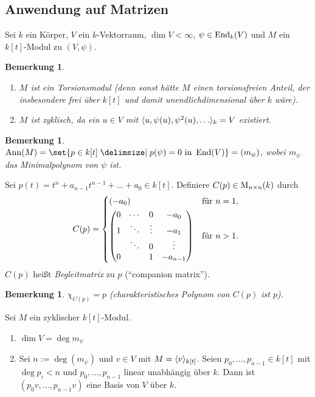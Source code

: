 \documentclass[12pt,a4paper]{scrartcl}
\theoremstyle{cplain}
\theoremstyle{cdef}
\newtheorem{beme}[thmcounter]{Bemerkung}
\begin{document}
\subsection{Anwendung auf Matrizen}
Sei $k$ ein Körper, $V$ ein $k$-Vektorraum, $\dim V<\infty$, $\psi\in \operatorname{End}_k(V)$ und $M$ ein $k[t]$-Modul zu $(V,\psi)$.
\begin{beme} \label{bem:4.18}
	\leavevmode
	\begin{enumerate}
		\item $M$ ist ein Torsionsmodul (denn sonst hätte $M$ einen torsionsfreien Anteil, der insbesondere frei über $k[t]$ und damit unendlichdimensional über $k$ wäre).
		\item $M$ ist zyklisch, da ein $u\in V$ mit $\<u, \psi(u), \psi^2(u),\dots\>_k = V$ existiert.
	\end{enumerate}
\end{beme}
\begin{beme}
	$\Ann(M) = \set{p\in k[t] \given p(\psi) = 0 \text{ in } \End(V)} = (m_{\psi})$, wobei $m_{\psi}$ das Minimalpolynom von $\psi$ ist.
\end{beme}
\begin{defi}
	Sei $p(t) = t^n+a_{n-1}t^{n-1}+\dots + a_0\in k[t]$. Definiere $C(p) \in \operatorname{M}_{n\times n}(k)$ durch \[
		C(p) = \begin{cases*}
			(-a_0) & für $n = 1$, \\
			\begin{pmatrix}
				0 & \cdots & 0 & -a_0 \\ 
				1 & \ddots & \vdots & -a_1 \\ 
				& \ddots & 0 & \vdots \\ 
				0 &  & 1 & -a_{n-1}
			\end{pmatrix} & für $n > 1$.
		\end{cases*}
	\]
	$C(p)$ heißt \emph{Begleitmatrix} zu $p$ (\enquote{companion matrix}).
\end{defi}
\begin{beme}
	$\chi_{C(p)} = p$ (charakteristisches Polynom von $C(p)$ ist $p$).
\end{beme}
\begin{lem} \label{lem:4.22}
	Sei $M$ ein zyklischer $k[t]$-Modul.
	\begin{enumerate}
		\item $\dim V = \deg m_{\psi}$ \label{lem:4.22:i}
		\item Sei $n := \deg(m_{\psi})$ und $v\in V$ mit $M = \langle v\rangle_{k[t]}$. Seien $p_0,\dots, p_{n-1}\in k[t]$ mit $\deg p_i<n$ und $p_0,\dots, p_{n-1}$ linear unabhängig über $k$. Dann ist $(p_0v, \dots, p_{n-1}v)$ eine Basis von $V$ über $k$. \label{lem:4.22:ii}
	\end{enumerate}
\end{lem}
\end{document}
